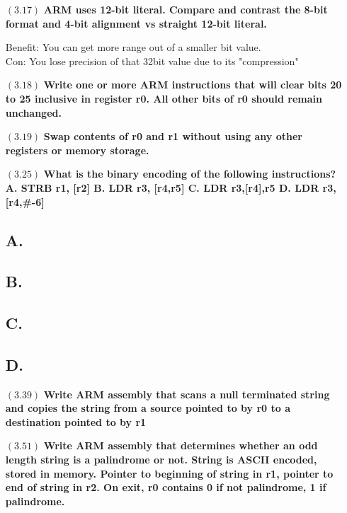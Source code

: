 \documentclass[letterpaper,10pt,titlepage]{article}
\def\braces#1{[#1]}
\begin{document}
\begin{enumerate}
\item[$(3.17)$] \textbf{ARM uses 12-bit literal. Compare and contrast the 8-bit format and 4-bit alignment vs straight 12-bit literal.}

Benefit: You can get more range out of a smaller bit value.\\
Con: You lose precision of that 32bit value due to its "compression"
  
\item[$(3.18)$] \textbf{Write one or more ARM instructions that will clear bits 20 to 25 inclusive in register r0. All other bits of r0 should remain unchanged.}


\item[$(3.19)$] \textbf{Swap contents of r0 and r1 without using any other registers or memory storage.}


\item[$(3.25)$] \textbf{What is the binary encoding of the following instructions? A. STRB r1, \braces{r2} B. LDR r3, \braces{r4,r5}\! C. LDR r3,\braces{r4},r5 D. LDR r3, \braces{r4,\#-6}\!}
\subsection*{A.}
\subsection*{B.}
\subsection*{C.}
\subsection*{D.}

\item[$(3.39)$] \textbf{Write ARM assembly that scans a null terminated string and copies the string from a source pointed to by r0 to a destination pointed to by r1}



\item[$(3.51)$] \textbf{Write ARM assembly that determines whether an odd length string is a palindrome or not. String is ASCII encoded, stored in memory. Pointer to beginning of string in r1, pointer to end of string in r2. On exit, r0 contains 0 if not palindrome, 1 if palindrome.}


\end{enumerate}
\end{document}
